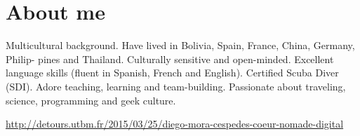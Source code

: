 \documentclass[]{friggeri-cv}
\begin{document}
\section{About me}
Multicultural background. Have lived in Bolivia, Spain, France, China, Germany, Philip-
pines and Thailand. Culturally sensitive and open-minded. Excellent language skills (fluent
in Spanish, French and English). Certified Scuba Diver (SDI). Adore teaching, learning and
team-building. Passionate about traveling, science, programming and geek culture.

\href{http://detours.utbm.fr/2015/03/25/diego-mora-cespedes-coeur-nomade-digital}{http://detours.utbm.fr/2015/03/25/diego-mora-cespedes-coeur-nomade-digital}
\end{document}
